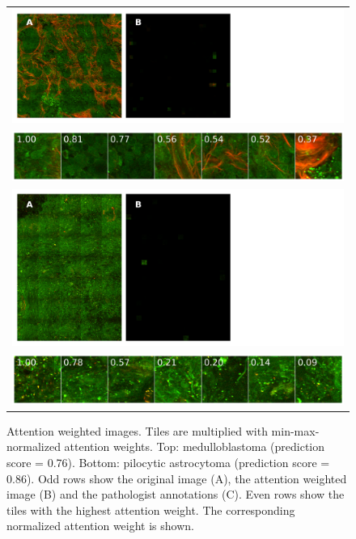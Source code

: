 \begin{figure}
    \centering
    \begin{tabular}[\linewidth]{c}
        \includegraphics[width=\linewidth]{pediatric-brain-tumours/images/PMC_HHG_36_Hersenen_I-05_8x8_200slow-summary.png} \\
        \includegraphics[width=\linewidth]{pediatric-brain-tumours/images/PMC_HHG_36_Hersenen_I-05_8x8_200slow-tiles.png} \\
        \midrule
        \includegraphics[width=\linewidth]{pediatric-brain-tumours/images/PMC_HHG_32_Hersenen_I-05_5x7_200slow_II-summary.png} \\
        \includegraphics[width=\linewidth]{pediatric-brain-tumours/images/PMC_HHG_32_Hersenen_I-05_5x7_200slow_II-tiles.png}
    \end{tabular}
    \caption[Attention weighted images]{
        Attention weighted images.
        Tiles are multiplied with min-max-normalized attention weights.
        Top: medulloblastoma (prediction score = 0.76).
        Bottom: pilocytic astrocytoma (prediction score = 0.86).
        Odd rows show the original image (A), the attention weighted image (B) and the pathologist annotations (C).
        Even rows show the tiles with the highest attention weight.
        The corresponding normalized attention weight is shown.
    }
    \label{fig:a-weighted-images}
\end{figure}